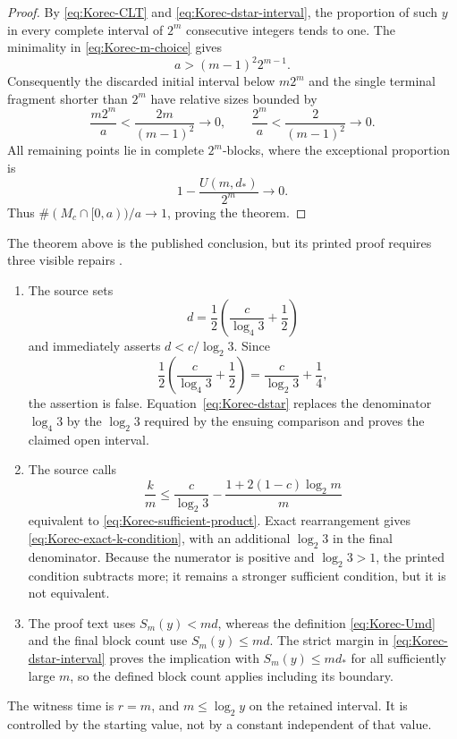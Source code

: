 \begin{proof}
By \eqref{eq:Korec-CLT} and \eqref{eq:Korec-dstar-interval}, the proportion
of such \(y\) in every complete interval of \(2^m\) consecutive integers
tends to one.  The minimality in \eqref{eq:Korec-m-choice} gives
\[
 a>(m-1)^2 2^{m-1}.
\]
Consequently the discarded initial interval below \(m2^m\) and the single
terminal fragment shorter than \(2^m\) have relative sizes bounded by
\[
 \frac{m2^m}{a}<\frac{2m}{(m-1)^2}\longrightarrow0,
 \qquad
 \frac{2^m}{a}<\frac{2}{(m-1)^2}\longrightarrow0.
\]
All remaining points lie in complete \(2^m\)-blocks, where the exceptional
proportion is
\[
 1-\frac{U(m,d_*)}{2^m}\longrightarrow0.
\]
Thus \(\#(M_c\cap[0,a))/a\to1\), proving the theorem.
\end{proof}

\begin{sourceissue}
\label{sourceissue:Korec-1994-defects}
The theorem above is the published conclusion, but its printed proof
requires three visible repairs \cite[pp.~86--88]{Korec1994}.
\begin{enumerate}
\item The source sets
\[
 d=\frac12\left(\frac{c}{\log_4 3}+\frac12\right)
\]
and immediately asserts \(d<c/\log_2 3\).  Since
\[
 \frac12\left(\frac{c}{\log_4 3}+\frac12\right)
 =\frac{c}{\log_2 3}+\frac14,
\]
the assertion is false.  Equation~\eqref{eq:Korec-dstar} replaces the
denominator \(\log_4 3\) by the \(\log_2 3\) required by the ensuing
comparison and proves the claimed open interval.

\item The source calls
\[
 \frac{k}{m}\le
 \frac{c}{\log_2 3}
 -\frac{1+2(1-c)\log_2m}{m}
\]
equivalent to \eqref{eq:Korec-sufficient-product}.  Exact rearrangement gives
\eqref{eq:Korec-exact-k-condition}, with an additional
\(\log_2 3\) in the final denominator.  Because the numerator is positive
and \(\log_2 3>1\), the printed condition subtracts more; it remains a
stronger sufficient condition, but it is not equivalent.

\item The proof text uses \(S_m(y)<md\), whereas the definition
\eqref{eq:Korec-Umd} and the final block count use \(S_m(y)\le md\).
The strict margin in \eqref{eq:Korec-dstar-interval} proves the implication
with \(S_m(y)\le md_*\) for all sufficiently large \(m\), so the defined
block count applies including its boundary.
\end{enumerate}
The witness time is \(r=m\), and \(m\le\log_2y\) on the retained interval.
It is controlled by the starting value, not by a constant independent of
that value.
\end{sourceissue}

